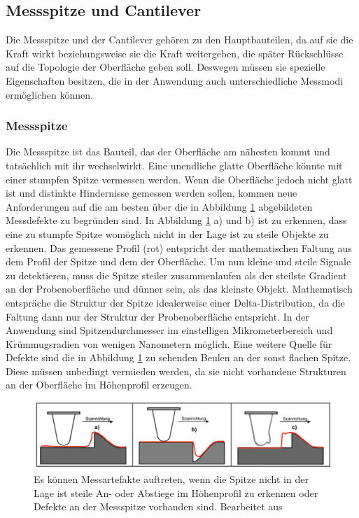       \subsection{Messspitze und Cantilever}
        Die Messspitze und der Cantilever gehören zu den Hauptbauteilen, da auf sie die Kraft wirkt beziehungsweise sie die Kraft weitergeben, die später Rückschlüsse auf die Topologie der Oberfläche geben soll.
        Deswegen müssen sie spezielle Eigenschaften besitzen, die in der Anwendung auch unterschiedliche Messmodi ermöglichen können.

        \subsubsection*{Messspitze}
          Die Messspitze ist das Bauteil, das der Oberfläche am nähesten kommt und tatsächlich mit ihr wechselwirkt. Eine unendliche glatte Oberfläche könnte mit einer stumpfen Spitze vermessen werden. Wenn
          die Oberfläche jedoch nicht glatt ist und distinkte Hindernisse gemessen werden sollen, kommen neue Anforderungen auf die am besten über die in Abbildung \ref{fig:defekte} abgebildeten Messdefekte
          zu begründen sind. In Abbildung \ref{fig:defekte} a) und b) ist zu erkennen, dass eine zu stumpfe Spitze womöglich nicht in der Lage ist zu steile Objekte zu erkennen. Das gemessene Profil (rot) entspricht der mathematischen Faltung aus dem Profil der Spitze und dem der Oberfläche. Um nun kleine und steile Signale zu detektieren, muss die Spitze steiler zusammenlaufen als der steilste Gradient an der Probenoberfläche und dünner sein, als das kleinste Objekt. Mathematisch entspräche die Struktur der Spitze idealerweise einer Delta-Distribution, da die Faltung dann nur der Struktur der Probenoberfläche entspricht. In der Anwendung sind Spitzendurchmesser im einstelligen Mikrometerbereich und Krümmugsradien von wenigen Nanometern möglich. 
          Eine weitere Quelle für Defekte sind die in Abbildung \ref{fig:defekte} zu sehenden Beulen an der sonst flachen Spitze. Diese müssen unbedingt vermieden werden, da sie nicht vorhandene Strukturen an der Oberfläche im Höhenprofil erzeugen. 
        
          \FloatBarrier

          \begin{figure}[h]
            \centering
            \includegraphics[width = 1\textwidth]{pictures/defekte.png}
            \caption{Es können Messartefakte auftreten, wenn die Spitze nicht in der Lage ist steile An- oder Abstiege im Höhenprofil zu erkennen oder Defekte an der Messspitze vorhanden sind. Bearbeitet aus \cite{tu_dortmund_versuchsanleitung_nodate}}
            \label{fig:defekte}
          \end{figure}
        
